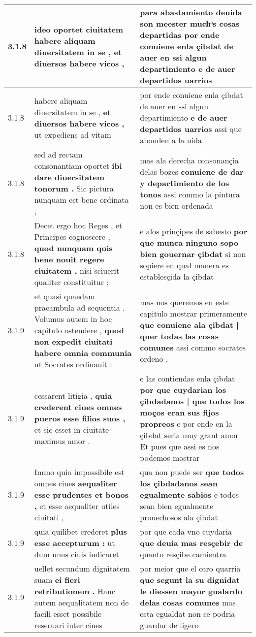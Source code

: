 \begin{tabular}{|p{1cm}|p{6.5cm}|p{6.5cm}|}
3.1.8 & ideo oportet ciuitatem \textbf{ habere aliquam diuersitatem in se , } et diuersos habere vicos , & para abastamiento deuida son meester muchͣs cosas departidas \textbf{ por ende conuiene enla çibdat de auer en ssi algun departimiento } e de auer departidos uarrios \\\hline
3.1.8 & habere aliquam diuersitatem in se , \textbf{ et diuersos habere vicos , } ut expediens ad vitam & por ende conuiene enla çibdat de auer en ssi algun departimiento \textbf{ e de auer departidos uarrios } assi que abonden a la uida \\\hline
3.1.8 & sed ad rectam consonantiam oportet \textbf{ ibi dare diuersitatem tonorum . } Sic pictura nunquam est bene ordinata , & mas ala derecha consonançia delas bozes \textbf{ conuiene de dar y departimiento de los tonos } assi commo la pintura non es bien ordenada \\\hline
3.1.8 & Decet ergo hoc Reges , et Principes cognoscere , \textbf{ quod nunquam quis bene nouit regere ciuitatem , } nisi sciuerit qualiter constituitur ; & e alos prinçipes de sabesto \textbf{ por que munca ninguno sopo bien gouernar çibdat } si non sopiere en qual manera es establesçida la çibdat \\\hline
3.1.9 & et quasi quaedam praeambula ad sequentia . Volumus autem in hoc capitulo ostendere , \textbf{ quod non expedit ciuitati habere omnia communia } ut Socrates ordinauit : & mas nos queremos en este capitulo mostrar primeramente \textbf{ que conuiene ala çibdat | quer todas las cosas comunes } assi commo socrates ordeno . \\\hline
3.1.9 & cessarent litigia , \textbf{ quia crederent ciues omnes pueros esse filios suos , } et sic esset in ciuitate maximus amor . & e las contiendas enla çibdat \textbf{ por que cuydarian los çibdadanos | que todos los moços eran sus fijos propreos } e por ende en la çibdat seria muy grant amor Et pues que assi es nos podemos mostrar \\\hline
3.1.9 & Immo quia impossibile est omnes ciues \textbf{ aequaliter esse prudentes et bonos , } et esse aequaliter utiles ciuitati , & qua non puede ser \textbf{ que todos los çibdadanos sean egualmente sabios } e todos sean bien egualmente prouechosos ala çibdat \\\hline
3.1.9 & quia quilibet crederet \textbf{ plus esse accepturum : } ut dum unus ciuis iudicaret & por que cada vno cuydaria \textbf{ que deuia mas resçebir de } quanto resçibe camientra \\\hline
3.1.9 & uellet secundum dignitatem suam \textbf{ ei fieri retributionem . } Hanc autem aequalitatem non de facili esset possibile reseruari inter ciues & por meior que el otro quarria \textbf{ que segunt la su dignỉdat le diessen mayor gualardo delas cosas comunes } mas esta egualdat non se podria guardar de ligero \\\hline

\end{tabular}
